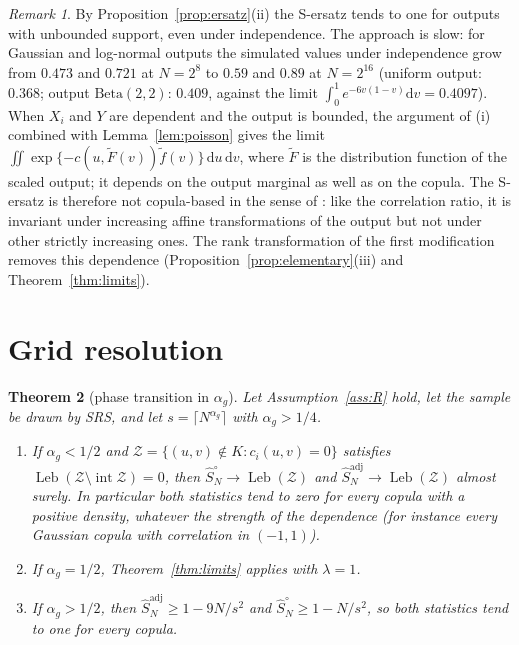 \documentclass[11pt,a4paper]{article}
\newtheorem{theorem}{Theorem}[section]
\theoremstyle{definition}
\theoremstyle{remark}
\newtheorem{remark}[theorem]{Remark}
\newcommand{\Leb}{\operatorname{Leb}}
\newcommand{\cZ}{\mathcal{Z}}
\newcommand{\Sadj}{\hat S^{\mathrm{adj}}_N}
\newcommand{\Sun}{\hat S^{\circ}_N}
\begin{document}
\begin{remark}\label{rem:ersatz}
By Proposition~\ref{prop:ersatz}(ii) the S-ersatz tends to one for outputs with unbounded support, even under independence. The approach is slow: for Gaussian and log-normal outputs the simulated values under independence grow from $0.473$ and $0.721$ at $N=2^8$ to $0.59$ and $0.89$ at $N=2^{16}$ (uniform output: $0.368$; output $\mathrm{Beta}(2,2)$: $0.409$, against the limit $\int_0^1e^{-6v(1-v)}\mathrm dv=0.4097$). When $X_i$ and $Y$ are dependent and the output is bounded, the argument of (i) combined with Lemma~\ref{lem:poisson} gives the limit $\iint\exp\{-c(u,\tilde F(v))\tilde f(v)\}\,\mathrm du\,\mathrm dv$, where $\tilde F$ is the distribution function of the scaled output; it depends on the output marginal as well as on the copula. The S-ersatz is therefore not copula-based in the sense of \citet[Table~1]{plischke2019}: like the correlation ratio, it is invariant under increasing affine transformations of the output but not under other strictly increasing ones. The rank transformation of the first modification removes this dependence (Proposition~\ref{prop:elementary}(iii) and Theorem~\ref{thm:limits}).
\end{remark}

\section{Grid resolution}\label{sec:grid}

\begin{theorem}[phase transition in $\alpha_g$]\label{thm:grid}
Let Assumption~\ref{ass:R} hold, let the sample be drawn by SRS, and let $s=\lceil N^{\alpha_g}\rceil$ with $\alpha_g>1/4$.
\begin{enumerate}[label=(\roman*)]
\item If $\alpha_g<1/2$ and $\cZ=\{(u,v)\notin K:c_i(u,v)=0\}$ satisfies $\Leb(\cZ\setminus\operatorname{int}\cZ)=0$, then $\Sun\to\Leb(\cZ)$ and $\Sadj\to\Leb(\cZ)$ almost surely. In particular both statistics tend to zero for every copula with a positive density, whatever the strength of the dependence (for instance every Gaussian copula with correlation in $(-1,1)$).
\item If $\alpha_g=1/2$, Theorem~\ref{thm:limits} applies with $\lambda=1$.
\item If $\alpha_g>1/2$, then $\Sadj\ge1-9N/s^2$ and $\Sun\ge1-N/s^2$, so both statistics tend to one for every copula.
\end{enumerate}
\end{theorem}
\end{document}
